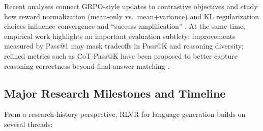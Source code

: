 \documentclass[unnumsec,webpdf,contemporary,large]{oup-authoring-template}
\theoremstyle{thmstyleone}
\theoremstyle{thmstyletwo}
\theoremstyle{thmstylethree}
\begin{document}
Recent analyses connect GRPO-style updates to contrastive objectives and study how reward normalization (mean-only vs.\ mean+variance) and KL regularization choices influence convergence and ``success amplification'' \cite{mroueh2025grpo}.
At the same time, empirical work highlights an important evaluation subtlety: improvements measured by Pass@1 may mask tradeoffs in Pass@K and reasoning diversity; refined metrics such as CoT-Pass@K have been proposed to better capture reasoning correctness beyond final-answer matching \cite{wen2025rlvr}.

\subsection{Major Research Milestones and Timeline}

From a research-history perspective, RLVR for language generation builds on several threads:
\end{document}
